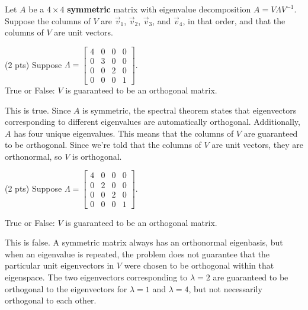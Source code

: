 \documentclass[11pt]{article}
\begin{document}
\begin{prob}[(12 pts)]
Let $A$ be a $4 \times 4$ \textbf{symmetric} matrix with eigenvalue decomposition $A = V \Lambda V^{-1}$. Suppose the columns of $V$ are $\vec v_1$, $\vec v_2$, $\vec v_3$, and $\vec v_4$, in that order, and that the columns of $V$ are unit vectors.


\begin{subprob}(2 pts) Suppose $\Lambda = \begin{bmatrix} 4 & 0 & 0 & 0 \\ 0 & 3 & 0 & 0 \\ 0 & 0 & 2 & 0 \\ 0 & 0 & 0 & 1 \end{bmatrix}$. \\

True or False: $V$ is guaranteed to be an orthogonal matrix.

 
\begin{solution}
This is true. Since $A$ is symmetric, the spectral theorem states that eigenvectors corresponding to different eigenvalues are automatically orthogonal. Additionally, $A$ has four unique eigenvalues. This means that the columns of $V$ are guaranteed to be orthogonal. Since we're told that the columns of $V$ are unit vectors, they are orthonormal, so $V$ is orthogonal.
\end{solution}
\end{subprob}

\begin{subprob}(2 pts) Suppose $\Lambda = \begin{bmatrix} 4 & 0 & 0 & 0 \\ 0 & 2 & 0 & 0 \\ 0 & 0 & 2 & 0 \\ 0 & 0 & 0 & 1 \end{bmatrix}$.

True or False: $V$ is guaranteed to be an orthogonal matrix.

 
\begin{solution}
This is false. A symmetric matrix always has an orthonormal eigenbasis, but when an eigenvalue is repeated, the problem does not guarantee that the particular unit eigenvectors in $V$ were chosen to be orthogonal within that eigenspace. The two eigenvectors corresponding to $\lambda = 2$ are guaranteed to be orthogonal to the eigenvectors for $\lambda = 1$ and $\lambda = 4$, but not necessarily orthogonal to each other.
\end{solution}
\end{subprob}


\end{prob}
\end{document}
